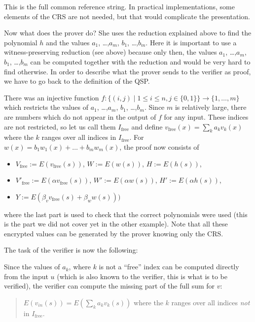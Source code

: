 \documentclass[11pt,letterpaper]{article}
\begin{document}
This is the full common reference string. In practical implementations, some elements of the CRS are not needed, but that would complicate the presentation.


Now what does the prover do? She uses the reduction explained above to find the polynomial $h$ and the values $a_{1}$, \dots,$a_{m }$, $b_{1}$, \dots,$b_{m}$. Here it is important to use a witness-preserving reduction (see above) because only then, the values $a_{1}$, \dots,$a_{m}$, $b_{1}$, \dots,$b_{m}$ can be computed together with the reduction and would be very hard to find otherwise. In order to describe what the prover sends to the verifier as proof, we have to go back to the definition of the QSP.


There was an injective function $f\colon \{(i, j) \mid 1 \le  i \le  n, j \in  \{0, 1\}\} \rightarrow \{1,  \dots, m\}$ which restricts the values of $a_{1}$, \dots,$a_{m}$, $b_{1}$, \dots,$b_{m}$. Since $m$ is relatively large, there are numbers which do not appear in the output of $f$ for any input. These indices are not restricted, so let us call them $I_{\mathrm{free}}$ and define $v_\mathrm{free}(x) = \sum_{k} a_{k}v_{k}(x)$ where the $k$ ranges over all indices in $I_\mathrm{free}$. For $w(x) = b_{1}w_{1}(x) +  \dots  + b_{m}w_{m}(x)$, the proof now consists of
\begin{itemize}
\item $V_\mathrm{free} := E(v_\mathrm{free}(s))$, \quad   $W := E(w(s))$, \quad   $H := E(h(s))$,
\item $V'_\mathrm{free} := E(\alpha  v_\mathrm{free}(s))$, \quad   $W' := E(\alpha  w(s))$, \quad   $H' := E(\alpha  h(s))$,
\item $Y := E(\beta _{v} v_\mathrm{free}(s) + \beta _{w} w(s)))$
\end{itemize}


where the last part is used to check that the correct polynomials were used (this is the part we did not cover yet in the other example). Note that all these encrypted values can be generated by the prover knowing only the CRS.


The task of the verifier is now the following:

Since the values of $a_{k}$, where $k$ is not a ``free'' index can be computed directly from the input $u$ (which is also known to the verifier, this is what is to be verified), the verifier can compute the missing part of the full sum for $v$:
\begin{quote}
$E(v_{in}(s)) = E(\sum_{k} a_{k}v_{k}(s))$ where the $k$ ranges over all indices \textit{not} in $I_\mathrm{free}$.
\end{quote}
\end{document}
